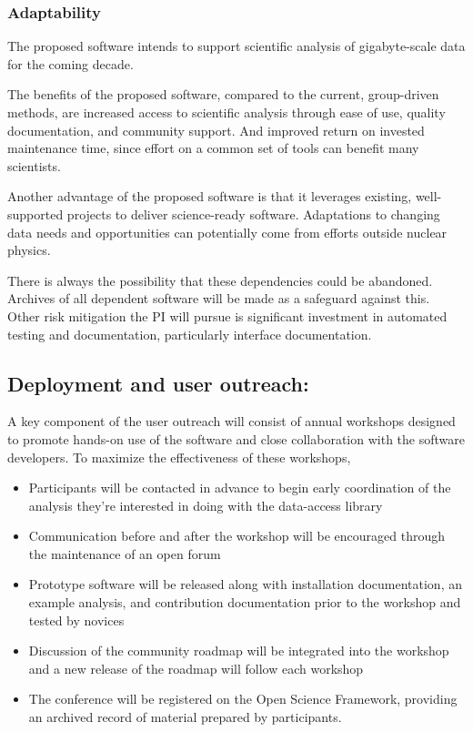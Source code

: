 \subsubsection{Adaptability}
The proposed software intends to support scientific analysis of gigabyte-scale data for the coming decade.

The benefits of the proposed software, compared to the current, group-driven methods, are increased access to scientific analysis through ease of use, quality documentation, and community support.  And improved return on invested maintenance time, since effort on a common set of tools can benefit many scientists.

Another advantage of the proposed software is that it leverages existing, well-supported projects to deliver science-ready software.  Adaptations to changing data needs and opportunities can potentially come from efforts outside nuclear physics.

There is always the possibility that these dependencies could be abandoned.  Archives of all dependent software will be made as a safeguard against this.  Other risk mitigation the PI will pursue is significant investment in automated testing and documentation, particularly interface documentation.

\subsection{Deployment and user outreach:}
A key component of the user outreach will consist of annual workshops designed to promote hands-on use of the software and close collaboration with the software developers.  To maximize the effectiveness of these workshops,

\begin{itemize}
    \item Participants will be contacted in advance to begin early coordination of the analysis they're interested in doing with the data-access library
    \item Communication before and after the workshop will be encouraged through the maintenance of an open forum
    \item Prototype software will be released along with installation documentation, an example analysis, and contribution documentation prior to the workshop and tested by novices
    \item Discussion of the community roadmap will be integrated into the workshop and a new release of the roadmap will follow each workshop
    \item The conference will be registered on the Open Science Framework, providing an archived record of material prepared by participants.
\end{itemize}

